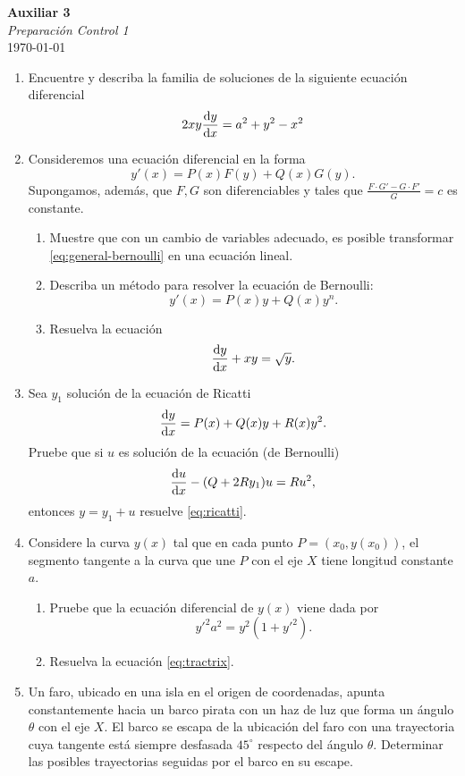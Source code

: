 \documentclass{article}
\begin{document}


\begin{center}
    \Huge{\textbf{Auxiliar 3}}\\
\textit{\large{Preparación Control 1}}\\
    \normalsize
    \today
\end{center}

\begin{enumerate}
	\item Encuentre y describa la familia de soluciones de la siguiente ecuación diferencial
		\[
			2xy \dv{y}{x} = a^2 + y^2 - x^2
		\]
\item Consideremos una ecuación diferencial en la forma
\begin{equation} \label{eq:general-bernoulli}
	y'(x) = P(x) F(y) + Q(x)G(y).
\end{equation}
Supongamos, además, que $F, G$ son diferenciables y tales que $\frac{F \cdot G' - G \cdot F'}{G} = c$ es constante.
\begin{enumerate}
	\item Muestre que con un cambio de variables adecuado, es posible transformar \eqref{eq:general-bernoulli} en una ecuación lineal.
	\item Describa un método para resolver la ecuación de Bernoulli:
		\[
			y'(x) = P(x)y + Q(x)y^n.
		\]
	\item Resuelva la ecuación
		\[
			\dv{y}{x} + xy = \sqrt{y}.
		\]
\end{enumerate}
\item Sea \(y_1\) solución de la ecuación de Ricatti
	\begin{equation} \label{eq:ricatti}
		\dv{y}{x} = P(x) + Q(x)y + R(x)y^2.
	\end{equation}
	Pruebe que si \(u\) es solución de la ecuación (de Bernoulli)
	\[
		\dv{u}{x} - (Q + 2Ry_1)u = Ru^2,
	\]
	entonces \(y = y_1 + u\) resuelve \eqref{eq:ricatti}.
\item Considere la curva \(y(x)\) tal que en cada punto \(P=(x_0, y(x_0))\), el segmento tangente a la curva que une \(P\) con el eje \(X\) tiene longitud constante \(a\).
	\begin{enumerate}
		\item Pruebe que la ecuación diferencial de \(y(x)\) viene dada por
			\begin{equation} \label{eq:tractrix}
				y'^2 a^2 = y^2(1 + y'^2).
			\end{equation}
		\item Resuelva la ecuación \eqref{eq:tractrix}.
	\end{enumerate}
\item Un faro, ubicado en una isla en el origen de coordenadas, apunta constantemente hacia un barco pirata con un haz de luz que forma un ángulo $\theta$ con el eje $X$. El barco se escapa de la ubicación del faro con una trayectoria cuya tangente está siempre desfasada $45^\circ$ respecto del ángulo $\theta$. Determinar las posibles trayectorias seguidas por el barco en su escape.

\end{enumerate}
\end{document}
